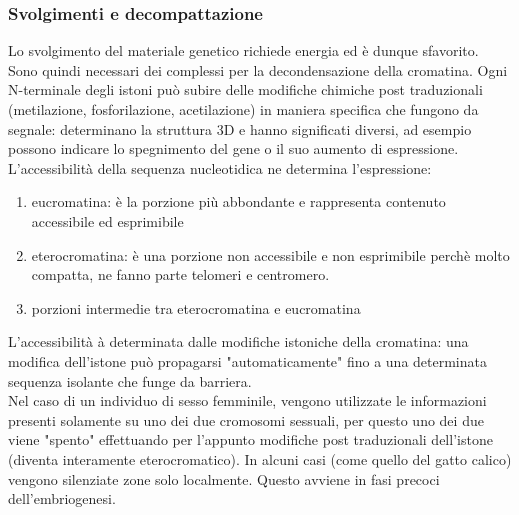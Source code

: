         \subsubsection{Svolgimenti e decompattazione}
            Lo svolgimento del materiale genetico richiede energia ed è dunque sfavorito. Sono quindi necessari dei complessi per la decondensazione della cromatina. Ogni N-terminale degli istoni può subire delle modifiche chimiche post traduzionali (metilazione, fosforilazione, acetilazione) in maniera specifica che fungono da segnale: determinano la struttura 3D e hanno significati diversi, ad esempio possono indicare lo spegnimento del gene o il suo aumento di espressione.\\
            L'accessibilità della sequenza nucleotidica ne determina l'espressione:
            \begin{enumerate}
                \item eucromatina: è la porzione più abbondante e rappresenta contenuto accessibile ed esprimibile
                \item eterocromatina: è una porzione non accessibile e non esprimibile perchè molto compatta, ne fanno parte telomeri e centromero.
                \item porzioni intermedie tra eterocromatina e eucromatina
            \end{enumerate}
            L'accessibilità à determinata dalle modifiche istoniche della cromatina: una modifica dell'istone può propagarsi "automaticamente" fino a una determinata sequenza isolante che funge da barriera.\\
            Nel caso di un individuo di sesso femminile, vengono utilizzate le informazioni presenti solamente su uno dei due cromosomi sessuali, per questo uno dei due viene "spento" effettuando per l'appunto modifiche post traduzionali dell'istone (diventa interamente eterocromatico). In alcuni casi (come quello del gatto calico) vengono silenziate zone solo localmente. Questo avviene in fasi precoci dell'embriogenesi.
        
